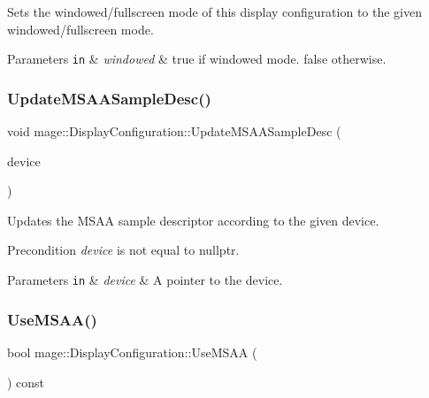 Sets the windowed/fullscreen mode of this display configuration to the given windowed/fullscreen mode.


\begin{DoxyParams}[1]{Parameters}
\mbox{\tt in}  & {\em windowed} & {\ttfamily true} if windowed mode. {\ttfamily false} otherwise. \\
\hline
\end{DoxyParams}
\hypertarget{structmage_1_1_display_configuration_a8eb7b1f0d0dbdd7ab384f61955609496}{}\label{structmage_1_1_display_configuration_a8eb7b1f0d0dbdd7ab384f61955609496} 
\subsubsection{\texorpdfstring{Update\+M\+S\+A\+A\+Sample\+Desc()}{UpdateMSAASampleDesc()}}
{\footnotesize\ttfamily void mage\+::\+Display\+Configuration\+::\+Update\+M\+S\+A\+A\+Sample\+Desc (\begin{DoxyParamCaption}\item[{I\+D3\+D11\+Device2 $\ast$}]{device }\end{DoxyParamCaption})\hspace{0.3cm}{\ttfamily [noexcept]}}

Updates the M\+S\+AA sample descriptor according to the given device.

\begin{DoxyPrecond}{Precondition}
{\itshape device} is not equal to {\ttfamily nullptr}. 
\end{DoxyPrecond}

\begin{DoxyParams}[1]{Parameters}
\mbox{\tt in}  & {\em device} & A pointer to the device. \\
\hline
\end{DoxyParams}
\hypertarget{structmage_1_1_display_configuration_a7bf7445c7242fc8d943b04d1975cfa72}{}\label{structmage_1_1_display_configuration_a7bf7445c7242fc8d943b04d1975cfa72} 
\subsubsection{\texorpdfstring{Use\+M\+S\+A\+A()}{UseMSAA()}}
{\footnotesize\ttfamily bool mage\+::\+Display\+Configuration\+::\+Use\+M\+S\+AA (\begin{DoxyParamCaption}{ }\end{DoxyParamCaption}) const\hspace{0.3cm}{\ttfamily [noexcept]}}

